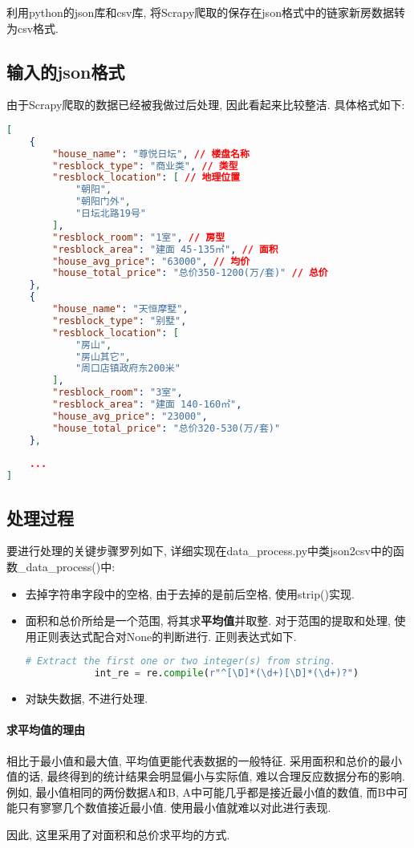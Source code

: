 利用python的json库和csv库,
将Scrapy爬取的保存在json格式中的链家新房数据转为csv格式.\par

\subsection{输入的json格式}
由于Scrapy爬取的数据已经被我做过后处理, 因此看起来比较整洁. 具体格式如下:
\begin{lstlisting}[language=json]
[
    {
        "house_name": "尊悦日坛", // 楼盘名称
        "resblock_type": "商业类", // 类型
        "resblock_location": [ // 地理位置
            "朝阳",
            "朝阳门外",
            "日坛北路19号"
        ],
        "resblock_room": "1室", // 房型
        "resblock_area": "建面 45-135㎡", // 面积
        "house_avg_price": "63000", // 均价
        "house_total_price": "总价350-1200(万/套)" // 总价
    },
    {
        "house_name": "天恒摩墅",
        "resblock_type": "别墅",
        "resblock_location": [
            "房山",
            "房山其它",
            "周口店镇政府东200米"
        ],
        "resblock_room": "3室",
        "resblock_area": "建面 140-160㎡",
        "house_avg_price": "23000",
        "house_total_price": "总价320-530(万/套)"
    },
    
    ...
]
\end{lstlisting}

\subsection{处理过程}
要进行处理的关键步骤罗列如下,
详细实现在data\_process.py中类json2csv中的函数\_data\_process()中:
\begin{itemize}
    \item 去掉字符串字段中的空格, 由于去掉的是前后空格, 使用strip()实现.
    \item 面积和总价所给是一个范围, 将其求\textbf{平均值}并取整. 对于范围的提取和处理,
        使用正则表达式配合对None的判断进行. 正则表达式如下.
        \begin{lstlisting}[language=python]
            # Extract the first one or two integer(s) from string.
            int_re = re.compile(r"^[\D]*(\d+)[\D]*(\d+)?")
        \end{lstlisting}
    \item 对缺失数据, 不进行处理.
\end{itemize}

\paragraph{求平均值的理由} %
\label{par:求平均值的理由}
相比于最小值和最大值, 平均值更能代表数据的一般特征. 采用面积和总价的最小值的话,
最终得到的统计结果会明显偏小与实际值, 难以合理反应数据分布的影响. 例如,
最小值相同的两份数据A和B, A中可能几乎都是接近最小值的数值,
而B中可能只有寥寥几个数值接近最小值. 使用最小值就难以对此进行表现.\par
因此, 这里采用了对面积和总价求平均的方式.

